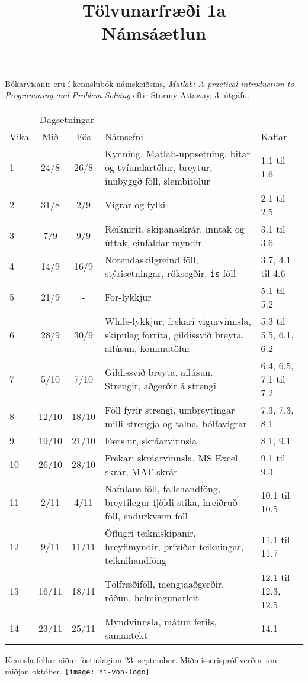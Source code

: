 \documentclass{article}
\title{Tölvunarfræði 1a \\ Námsáætlun \semester}
\author{}
\begin{document}
\maketitle
{}

Bókarvísanir eru í kennslubók námskeiðsins, \emph{Matlab: A practical introduction to Programming and Problem Solving} eftir Stormy Attaway, 3. útgáfu.
\vspace{0.5cm}
\begin{center}
\renewcommand{\arraystretch}{1.2}
\begin{tabularx}{\linewidth}{lccXp{1.8cm}}
\toprule
&\multicolumn{2}{c}{Dagsetningar}&&\\
\cmidrule{2-3}
Vika&Mið&Fös&Námsefni&Kaflar\\
\midrule
1	&24/8	&26/8	& Kynning, Matlab-uppsetning, bitar og tvíundartölur, breytur, innbyggð föll, slembitölur &1.1 til 1.6\\
2	&31/8	&2/9	& Vigrar og fylki&2.1 til 2.5\\
3	&7/9	&9/9	& Reiknirit, skipanaskrár, inntak og úttak, einfaldar myndir&3.1 til 3.6\\
4	&14/9	&16/9	& Notendaskilgreind föll, stýrisetningar, röksegðir, \texttt{is}-föll&3.7, 4.1 til 4.6\\
5	&21/9	&-	& For-lykkjur&5.1 til 5.2\\
6	&28/9	&30/9	& While-lykkjur, frekari vigurvinnsla, skipulag forrita, gildissvið breyta, aflúsun, kommutölur&5.3 til 5.5, 6.1, 6.2\\
7	&5/10	&7/10	& Gildissvið breyta, aflúsun. Strengir, aðgerðir á strengi&6.4, 6.5, 7.1 til 7.2\\
8	&12/10	&18/10	& Föll fyrir strengi, umbreytingar milli strengja og talna, hólfavigrar&7.3, 7.3, 8.1\\
9	&19/10	&21/10	& Færslur, skráarvinnsla&8.1, 9.1\\
10	&26/10	&28/10	& Frekari skráarvinnsla, MS Excel skrár, MAT-skrár&9.1 til 9.3\\
11	&2/11	&4/11	& Nafnlaus föll, fallshandföng, breytilegur fjöldi stika, hreiðruð föll, endurkvæm föll&10.1 til 10.5\\
12	&9/11	&11/11	& Öflugri teikniskipanir, hreyfimyndir, þrívíðar teikningar, teiknihandföng&11.1 til 11.7\\
13	&16/11	&18/11	& Tölfræðiföll, mengjaaðgerðir, röðun, helmingunarleit&12.1 til 12.3, 12.5\\
14	&23/11	&25/11	& Myndvinnsla, mátun ferils, samantekt&14.1\\
\bottomrule
\end{tabularx}
\end{center}
\vspace{0.5cm}
Kennsla fellur niður föstudaginn 23. september. Miðmisserispróf verður um miðjan október.
\vfill
\texttt{[image: hi-von-logo]}
\end{document}
